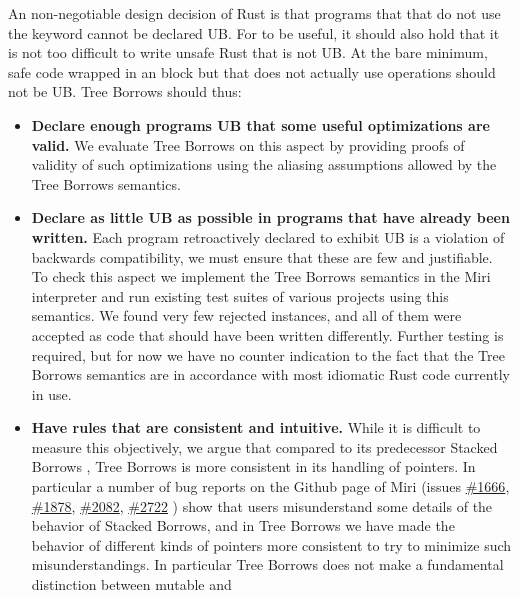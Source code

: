 \documentclass[a4paper,11pt]{article}
\theoremstyle{plain}
\theoremstyle{definition}
\theoremstyle{remark}
\newcommand{\tcode}[1]{\rstinline{#1}}
\begin{document}
An non-negotiable design decision of Rust is that programs that that do not use the
\tcode{unsafe} keyword cannot be declared UB. For \tcode{unsafe} to be useful,
it should also hold that it is not too difficult to write unsafe Rust that is not
UB. At the bare minimum, safe code wrapped in an \tcode{unafe} block but that does
not actually use \tcode{unsafe} operations should not be UB. Tree Borrows should thus:
\begin{itemize}
    \item \textbf{Declare enough programs UB that some useful optimizations are valid.}
        We evaluate Tree Borrows on this aspect by providing proofs of validity of such
        optimizations using the aliasing assumptions allowed by the Tree Borrows semantics.
    \item \textbf{Declare as little UB as possible in programs that have already been written.}
        Each program retroactively declared to exhibit UB is a violation of backwards compatibility,
        we must ensure that these are few and justifiable.
        To check this aspect we implement the Tree Borrows semantics in the Miri
        interpreter \cite{miri} and run existing test suites of various projects using this semantics.
        We found very few rejected instances, and all of them were accepted as
        code that should have been written differently. Further testing is required,
        but for now we have no counter indication to the fact that the Tree Borrows
        semantics are in accordance with most idiomatic Rust code currently in use.
    \item \textbf{Have rules that are consistent and intuitive.}
        While it is difficult to measure this objectively, we argue that compared
        to its predecessor Stacked Borrows \cite{stacked_borrows},
        Tree Borrows is more consistent in its handling of pointers. In particular
        a number of bug reports on the Github page of Miri (issues
        \href{https://github.com/rust-lang/miri/issues/1666}{\#1666},
        \href{https://github.com/rust-lang/miri/issues/1878}{\#1878},
        \href{https://github.com/rust-lang/miri/issues/2082}{\#2082},
        \href{https://github.com/rust-lang/miri/issues/2722}{\#2722}
        ) show that users misunderstand some details of the behavior of Stacked Borrows,
        and in Tree Borrows we have made the behavior of different kinds of pointers
        more consistent to try to minimize such misunderstandings. In particular
        Tree Borrows does not make a fundamental distinction between mutable and

\end{itemize}
\end{document}
